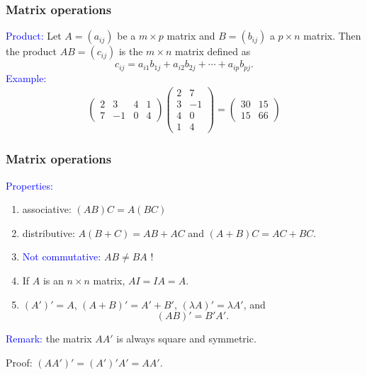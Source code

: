 \documentclass[11pt,aspectratio=169]{beamer}
\begin{document}
\begin{frame}
\frametitle{Matrix operations}
\begin{small}
\textcolor{blue}{Product:} Let $A=(a_{ij})$ be a $m \times p$ matrix and $B=(b_{ij})$ a $p \times n$ matrix. Then the product $AB=(c_{ij})$ is the $m\times n$ matrix defined as
$$
c_{ij}=a_{i1} b_{1j}+a_{i2} b_{2j}+\cdots +a_{ip} b_{pj}.
$$
\textcolor{blue}{Example:}
\begin{align*}\begin{pmatrix}2& 3 & 4 & 1\\
7 & -1 & 0 & 4
\end{pmatrix} \begin{pmatrix}2& 7\\
3 & -1 \\
4 & 0 \\
1& 4
\end{pmatrix}=\begin{pmatrix}30&  15\\
15 & 66
\end{pmatrix}
\end{align*}
\end{small}
\end{frame}


\begin{frame}
\frametitle{Matrix operations}
\begin{small}
\textcolor{blue}{Properties:} 
\begin{enumerate}
\item associative: $(AB)C=A(BC)$
\item distributive: $A(B+C)=AB+AC$ and $(A+B)C=AC+BC$.
\item \textcolor{blue}{Not commutative:} $AB \neq BA$ ! 
\item If $A$ is an $n \times n$ matrix, $AI=IA=A$.

\item $(A')'=A$, $(A+B)'=A'+B'$,
$(\lambda A)'=\lambda A'$, and $$(AB)'=B'A'.$$
\end{enumerate}

\textcolor{blue}{Remark:} the matrix  $AA'$ is always square and symmetric.

\begin{tiny}Proof: $(AA')'=(A')'A'=AA'$.  \end{tiny}

\end{small}
\end{frame}
\end{document}
